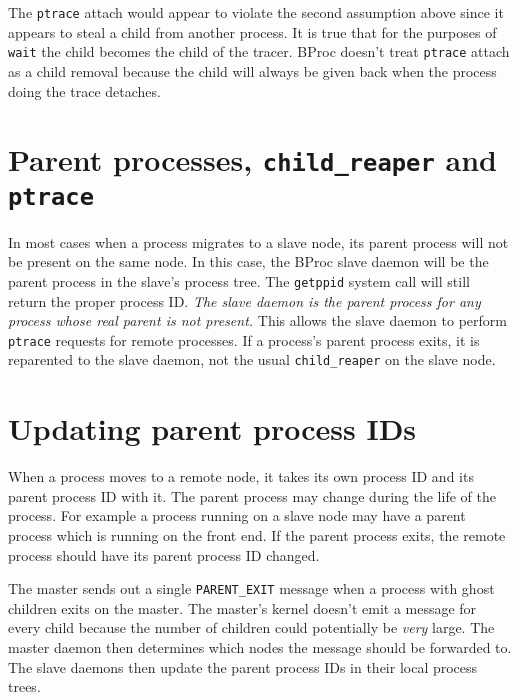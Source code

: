 The \texttt{ptrace} attach would appear to violate the second
assumption above since it appears to steal a child from another
process.  It is true that for the purposes of \texttt{wait} the child
becomes the child of the tracer.  BProc doesn't treat
\texttt{ptrace} attach as a child removal because the child will
always be given back when the process doing the trace detaches.


\section{Parent processes, \texttt{child\_reaper} and \texttt{ptrace}}
In most cases when a process migrates to a slave node, its parent
process will not be present on the same node.  In this case, the BProc
slave daemon will be the parent process in the slave's process tree.
The \texttt{getppid} system call will still return the proper process
ID.  \emph{The slave daemon is the parent process for any process
whose real parent is not present.}  This allows the slave daemon to
perform \texttt{ptrace} requests for remote processes.  If a process's
parent process exits, it is reparented to the slave daemon, not the
usual \texttt{child\_reaper} on the slave node.

\section{Updating parent process IDs}

When a process moves to a remote node, it takes its own process ID and
its parent process ID with it.  The parent process may change during
the life of the process.  For example a process running on a slave
node may have a parent process which is running on the front end.  If
the parent process exits, the remote process should have its parent
process ID changed.

The master sends out a single \texttt{PARENT\_EXIT} message when a
process with ghost children exits on the master.  The master's kernel
doesn't emit a message for every child because the number of children
could potentially be \emph{very} large.  The master daemon then
determines which nodes the message should be forwarded to.  The slave
daemons then update the parent process IDs in their local process
trees.

